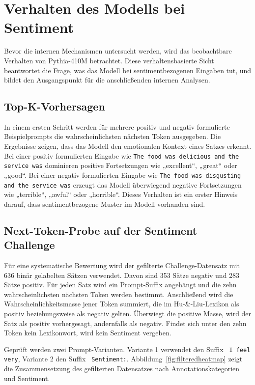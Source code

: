 \section{Verhalten des Modells bei Sentiment}

Bevor die internen Mechanismen untersucht werden, wird das beobachtbare Verhalten von Pythia-410M betrachtet. Diese verhaltensbasierte Sicht beantwortet die Frage, was das Modell bei sentimentbezogenen Eingaben tut, und bildet den Ausgangspunkt für die anschließenden internen Analysen.

\subsection{Top-K-Vorhersagen}

In einem ersten Schritt werden für mehrere positiv und negativ formulierte Beispielprompts die wahrscheinlichsten nächsten Token ausgegeben. Die Ergebnisse zeigen, dass das Modell den emotionalen Kontext eines Satzes erkennt. Bei einer positiv formulierten Eingabe wie \texttt{The food was delicious and the service was} dominieren positive Fortsetzungen wie „excellent“, „great“ oder „good“. Bei einer negativ formulierten Eingabe wie \texttt{The food was disgusting and the service was} erzeugt das Modell überwiegend negative Fortsetzungen wie „terrible“, „awful“ oder „horrible“. Dieses Verhalten ist ein erster Hinweis darauf, dass sentimentbezogene Muster im Modell vorhanden sind.

\subsection{Next-Token-Probe auf der Sentiment Challenge}

Für eine systematische Bewertung wird der gefilterte Challenge-Datensatz mit 636 binär gelabelten Sätzen verwendet. Davon sind 353 Sätze negativ und 283 Sätze positiv. Für jeden Satz wird ein Prompt-Suffix angehängt und die zehn wahrscheinlichsten nächsten Token werden bestimmt. Anschließend wird die Wahrscheinlichkeitsmasse jener Token summiert, die im Hu-\&-Liu-Lexikon als positiv beziehungsweise als negativ gelten. Überwiegt die positive Masse, wird der Satz als positiv vorhergesagt, andernfalls als negativ. Findet sich unter den zehn Token kein Lexikonwort, wird kein Sentiment vergeben.

Geprüft werden zwei Prompt-Varianten. Variante 1 verwendet den Suffix \texttt{ I feel very}, Variante 2 den Suffix \texttt{ Sentiment:}. Abbildung~\ref{fig:filteredheatmap} zeigt die Zusammensetzung des gefilterten Datensatzes nach Annotationskategorien und Sentiment.

